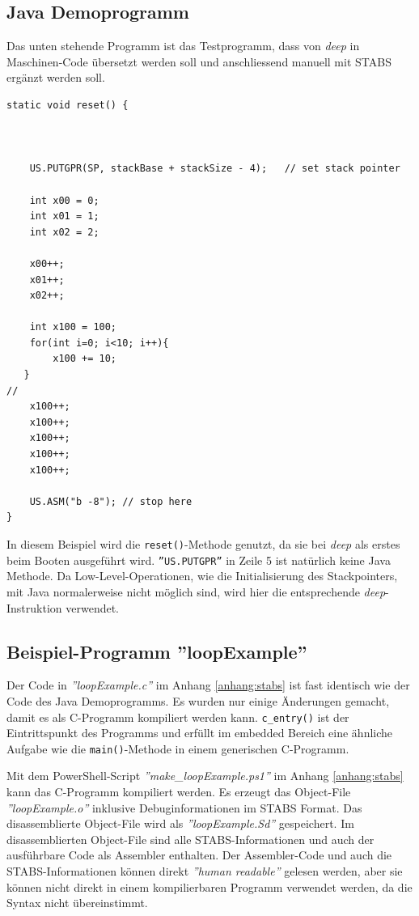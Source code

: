 \subsection{Java Demoprogramm}
Das unten stehende Programm ist das Testprogramm, dass von \textit{deep} in Maschinen-Code übersetzt werden soll und anschliessend manuell mit STABS ergänzt werden soll.

\lstset{language=java}
\begin{lstlisting}
static void reset() {



	US.PUTGPR(SP, stackBase + stackSize - 4);	// set stack pointer
	
	int x00 = 0;
	int x01 = 1;
	int x02 = 2;
	
	x00++;
	x01++;
	x02++;
	
	int x100 = 100;
	for(int i=0; i<10; i++){
		x100 += 10;
   }
//		
	x100++;
	x100++;
	x100++;
	x100++;
	x100++;

	US.ASM("b -8"); // stop here
}
\end{lstlisting}

In diesem Beispiel wird die \texttt{reset()}-Methode genutzt, da sie bei \textit{deep} als erstes beim Booten ausgeführt wird.
\texttt{''US.PUTGPR''} in Zeile 5 ist natürlich keine Java Methode.
Da Low-Level-Operationen, wie die Initialisierung des Stackpointers, mit Java normalerweise nicht möglich sind, wird hier die entsprechende \textit{deep}-Instruktion verwendet.


\subsection{Beispiel-Programm ''loopExample''}
Der Code in \textit{''loopExample.c''} im Anhang \ref{anhang:stabs} ist fast identisch wie der Code des Java Demoprogramms.
Es wurden nur einige Änderungen gemacht, damit es als C-Programm kompiliert werden kann.
\texttt{c\_entry()} ist der Eintrittspunkt des Programms und erfüllt im embedded Bereich eine ähnliche Aufgabe wie die  \texttt{main()}-Methode in einem generischen C-Programm.

Mit dem PowerShell-Script \textit{''make\_loopExample.ps1''} im Anhang \ref{anhang:stabs} kann das C-Programm kompiliert werden.
Es erzeugt das Object-File \textit{''loopExample.o''} inklusive Debuginformationen im STABS Format.
Das disassemblierte Object-File wird als \textit{''loopExample.Sd''} gespeichert.
Im disassemblierten Object-File sind alle STABS-Informationen und auch der ausführbare Code als Assembler enthalten.
Der Assembler-Code und auch die STABS-Informationen können direkt \textit{''human readable''} gelesen werden, aber sie können nicht direkt in einem kompilierbaren Programm verwendet werden, da die Syntax nicht übereinstimmt.

